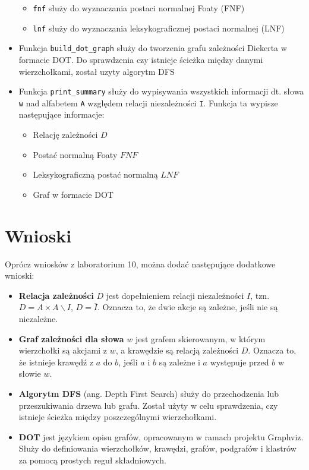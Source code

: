 \documentclass[11pt]{article}
\providecommand{\tightlist}{%
      \setlength{\itemsep}{0pt}\setlength{\parskip}{0pt}}
\begin{document}
\begin{itemize}
  \begin{itemize}
  \tightlist
  \item
    \texttt{fnf} służy do wyznaczania postaci normalnej Foaty (FNF)
  \item
    \texttt{lnf} służy do wyznaczania leksykograficznej postaci
    normalnej (LNF)
  \end{itemize}
\item
  Funkcja \texttt{build\_dot\_graph} służy do tworzenia grafu zależności
  Diekerta w formacie DOT. Do sprawdzenia czy istnieje ścieżka między
  danymi wierzchołkami, został uzyty algorytm DFS
\item
  Funkcja \texttt{print\_summary} służy do wypisywania wszystkich
  informacji dt. słowa \texttt{w} nad alfabetem \texttt{A} względem
  relacji niezależności \texttt{I}. Funkcja ta wypisze następujące
  informacje:

  \begin{itemize}
  \tightlist
  \item
    Relację zależności \(D\)
  \item
    Postać normalną Foaty \(FNF\)
  \item
    Leksykograficzną postać normalną \(LNF\)
  \item
    Graf w formacie DOT
  \end{itemize}
\end{itemize}

    \hypertarget{wnioski}{%
\section{Wnioski}\label{wnioski}}

Oprócz wniosków z laboratorium 10, można dodać następujące dodatkowe
wnioski:

\begin{itemize}
\item
  \textbf{Relacja zależności} \(D\) jest dopełnieniem relacji
  niezależności \(I\), tzn. \(D = A × A ∖ I\), \(D = \bar{I}\). Oznacza
  to, że dwie akcje są zależne, jeśli nie są niezależne.
\item
  \textbf{Graf zależności dla słowa} \(w\) jest grafem skierowanym, w
  którym wierzchołki są akcjami z \(w\), a krawędzie są relacją
  zależności \(D\). Oznacza to, że istnieje krawędź z \(a\) do \(b\),
  jeśli \(a\) i \(b\) są zależne i \(a\) występuje przed \(b\) w słowie
  \(w\).
\item
  \textbf{Algorytm DFS} (ang. Depth First Search) służy do przechodzenia
  lub przeszukiwania drzewa lub grafu. Został użyty w celu sprawdzenia,
  czy istnieje ścieżka między poszczególnymi wierzchołkami.
\item
  \textbf{DOT} jest językiem opisu grafów, opracowanym w ramach projektu
  Graphviz. Służy do definiowania wierzchołków, krawędzi, grafów,
  podgrafów i klastrów za pomocą prostych reguł składniowych.
\end{itemize}
\end{document}
